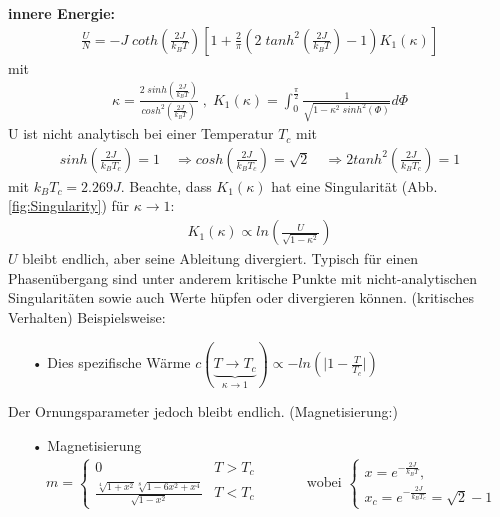 \documentclass[12pt]{article}
\begin{document}
\textbf{innere Energie:}
\begin{align}
\frac{U}{N}= - J \; coth\left( \frac{2J}{k_BT}\right) \left[ 1 + \frac{2}{\pi} \left( 2 \; tanh^2 \left( \frac{2J}{k_BT} \right) - 1 \right) K_1(\kappa ) \right]
\end{align}
mit
\begin{align}
\kappa= \frac{2 \; sinh \left( \frac{2J}{k_BT} \right)}{cosh^2 \left( \frac{2J}{k_BT} \right) } \; , \; K_1(\kappa)= \int_0^\frac{\pi}{2} \frac{1}{\sqrt{1- \kappa^2 \; sinh^2(\Phi)}} d\Phi
\end{align}
U ist nicht analytisch bei einer Temperatur $T_c$ mit 
\begin{align*}
sinh \left(\frac{2J}{k_BT_c} \right) = 1\quad \Rightarrow cosh \left(\frac{2J}{k_BT_c} \right)= \sqrt{2} \quad \Rightarrow 2 tanh^2\left( \frac{2J}{k_B T_c}\right) =1
\end{align*}
 mit $k_B T_c = 2.269 J$.
 Beachte, dass $K_1(\kappa)$ hat eine Singularität (Abb. \ref{fig:Singularity}) für $\kappa \to 1$:
 \begin{align*}
 K_1(\kappa) \propto  ln \left(\frac{U}{\sqrt{1-\kappa^2}} \right)
 \end{align*}
 $U$ bleibt endlich, aber seine Ableitung divergiert. Typisch für einen Phasenübergang sind unter anderem kritische Punkte mit nicht-analytischen Singularitäten sowie auch Werte hüpfen oder divergieren können. (kritisches Verhalten) Beispielsweise:
\begin{itemize}
\item[•] Dies spezifische Wärme $c(\underbrace{T \to T_c}_{\kappa \to 1}) \propto - ln \left(\vert 1- \frac{T}{T_c}\vert \right)$
\end{itemize}
Der Ornungsparameter jedoch bleibt endlich. (Magnetisierung:)
\begin{itemize}
\item[•] Magnetisierung 
\begin{align}
m=
\begin{cases}
0 & T>T_c \\
\frac{\sqrt[4]{1+x^2} \sqrt[8]{1-6x^2 +x^4} }{\sqrt{1-x^2}}& T<T_c
\end{cases} \quad \quad \quad \mbox{ wobei } 
\begin{cases}
x= e^{- \frac{2J}{k_B T}}, \\
 x_c=  e^{- \frac{2J}{k_B T_c}} = \sqrt{2} -1
 \end{cases}
\end{align}
\end{itemize}
\end{document}
